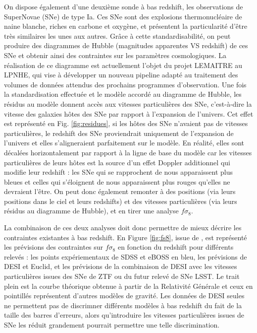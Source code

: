 \documentclass{article}
\begin{document}
On dispose également d'une deuxième sonde à bas redshift, les observations de SuperNovae (SNe) de type Ia. Ces SNe sont des explosions thermonucléaire de naine blanche, riches en carbone et oxygène, et présentent la particularité d'être très similaires les unes aux autres. Grâce à cette standardisabilité, on peut produire des diagrammes de Hubble (magnitudes apparentes VS redshift) de ces SNe et obtenir ainsi des contraintes sur les paramètres cosmologiques. La réalisation de ce diagramme est actuellement l'objet du projet LEMAITRE au LPNHE, qui vise à développer un nouveau pipeline adapté au traitement des volumes de données attendus des prochains programmes d'observation. Une fois la standardisation effectuée et le modèle accordé au diagramme de Hubble, les résidus au modèle donnent accès aux vitesses particulières des SNe, c'est-à-dire la vitesse des galaxies hôtes des SNe par rapport à l'expansion de l'univers. Cet effet est représenté en Fig. \ref{fig:residues}, si les hôtes des SNe n'avaient pas de vitesses particulières, le redshift des SNe proviendrait uniquement de l'expansion de l'univers et elles s'aligneraient parfaitement sur le modèle. En réalité, elles sont décalées horizontalement par rapport à la ligne de base du modèle car les vitesses particulières de leurs hôtes est la source d'un effet Doppler additionnel qui modifie leur redshift : les SNe qui se rapprochent de nous apparaissent plus bleues et celles qui s'éloignent de nous apparaissent plus rouges qu'elles ne devraient l'être. On peut donc également remonter à des positions (via leurs positions dans le ciel et leurs redshifts) et des vitesses particulières (via leurs résidus au diagramme de Hubble), et en tirer une analyse $f\sigma_8$.


La combinaison de ces deux analyses doit donc permettre de mieux décrire les contraintes existantes à bas redshift. En Figure \ref{fig:fs8}, issue de \cite{carreres_growth-rate_2023}, est représenté les prévisions des contraintes sur $f\sigma_8$ en fonction du redshift pour différents relevés : les points expériementaux de SDSS et eBOSS en bleu, les prévisions de DESI et Euclid, et les prévisions de la combinaison de DESI avec les vitesses particulières issues des SNe de ZTF ou du futur relevé de SNe LSST. Le trait plein est la courbe théorique obtenue à partir de la Relativité Générale et ceux en pointillés représentent d'autres modèles de gravité. Les données de DESI seules ne permettent pas de discrimner différents modèles à bas redshift du fait de la taille des barres d'erreurs, alors qu'introduire les vitesses particulières issues de SNe les réduit grandement pourrait permettre une telle discrimination.
\end{document}
